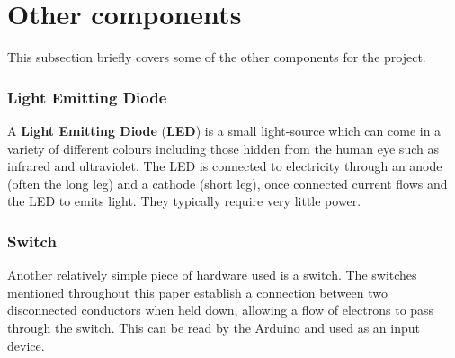 \section{Other components}
This subsection briefly covers some of the other components for the project.
\subsubsection{Light Emitting Diode}
A \textbf{Light Emitting Diode} (\textbf{LED}) is a small light-source which can come in a variety of different colours including those hidden from the human eye such as infrared and ultraviolet.
The LED is connected to electricity through an anode (often the long leg) and a cathode (short leg), once connected current flows and the LED to emits light.
They typically require very little power.

\subsubsection{Switch}
Another relatively simple piece of hardware used is a switch.
The switches mentioned throughout this paper establish a connection between two disconnected conductors when held down, allowing a flow of electrons to pass through the switch.
This can be read by the Arduino and used as an input device. 